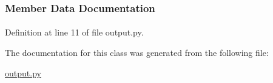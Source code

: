 \subsubsection{\-Member \-Data \-Documentation}
\hypertarget{classforcebalance_1_1output_1_1ForceBalanceLogger_abc9e80457d0e8d0eafce905309a7da45}{
\paragraph[{default\-Handler}]{}}\label{classforcebalance_1_1output_1_1ForceBalanceLogger_abc9e80457d0e8d0eafce905309a7da45}


\-Definition at line 11 of file output.\-py.



\-The documentation for this class was generated from the following file\-:\begin{DoxyCompactItemize}
\item 
\hyperlink{output_8py}{output.\-py}\end{DoxyCompactItemize}

